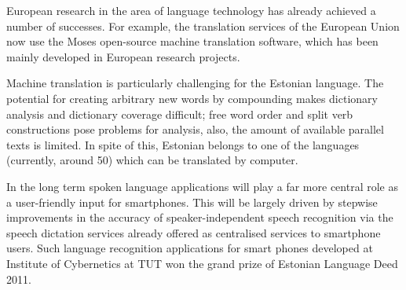 \documentclass[]{../metanetpaper}
\begin{document}
\begin{multicols}{2}
European research in the area of language technology has already achieved a number of successes. For example, the translation services of the European Union now use the Moses open-source machine translation software, which has been mainly developed in European research projects. 

Machine translation is particularly challenging for the Estonian language. 
The potential for creating arbitrary new words by compounding makes dictionary analysis and dictionary coverage difficult; free word order and split verb constructions pose problems for analysis, also, the amount of available parallel texts is limited. 
In spite of this, Estonian belongs to one of the languages (currently, around 50) which can be translated by computer.

In the long term spoken language applications will play a far more central role as a user-friendly input for smartphones. This will be largely driven by stepwise improvements in the accuracy of speaker-independent speech recognition via the speech dictation services already offered as centralised services to smartphone users. 
Such language recognition applications for smart phones developed at Institute of Cybernetics at TUT won the grand prize of Estonian Language Deed 2011.


\end{multicols}
\end{document}
